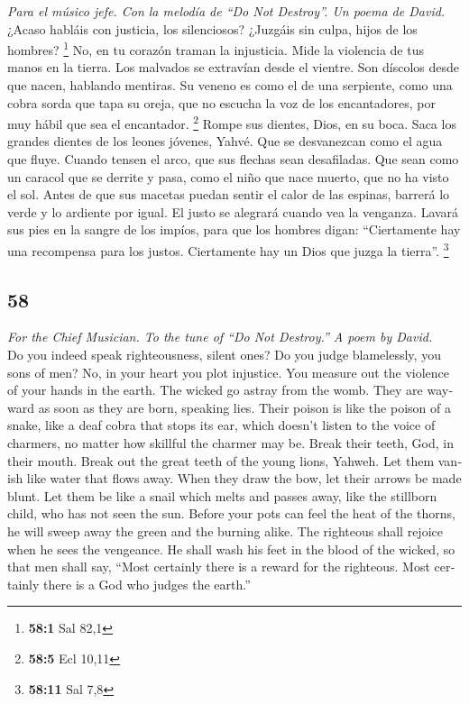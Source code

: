 \begin{paracol}{2}
\emph{Para el músico jefe. Con la melodía de ``Do Not Destroy''. Un
poema de David.}\\
 ¿Acaso habláis con justicia, los silenciosos? ¿Juzgáis
sin culpa, hijos de los hombres? \footnote{\textbf{58:1} Sal 82,1}
 No, en tu corazón traman la injusticia. Mide la violencia
de tus manos en la tierra.  Los malvados se extravían
desde el vientre. Son díscolos desde que nacen, hablando mentiras.
 Su veneno es como el de una serpiente, como una cobra
sorda que tapa su oreja,  que no escucha la voz de los
encantadores, por muy hábil que sea el encantador. \footnote{\textbf{58:5}
  Ecl 10,11}  Rompe sus dientes, Dios, en su boca. Saca
los grandes dientes de los leones jóvenes, Yahvé.  Que se
desvanezcan como el agua que fluye. Cuando tensen el arco, que sus
flechas sean desafiladas.  Que sean como un caracol que se
derrite y pasa, como el niño que nace muerto, que no ha visto el sol.
 Antes de que sus macetas puedan sentir el calor de las
espinas, barrerá lo verde y lo ardiente por igual.  El
justo se alegrará cuando vea la venganza. Lavará sus pies en la sangre
de los impíos,  para que los hombres digan: ``Ciertamente
hay una recompensa para los justos. Ciertamente hay un Dios que juzga la
tierra''. \footnote{\textbf{58:11} Sal 7,8}

\switchcolumn
\begin{otherlanguage}{english}

\hypertarget{section-115}{%
\section{58}\label{section-115}}

\emph{For the Chief Musician. To the tune of ``Do Not Destroy.'' A poem
by David.}\\
 Do you indeed speak righteousness, silent ones? Do you
judge blamelessly, you sons of men?  No, in your heart you
plot injustice. You measure out the violence of your hands in the earth.
 The wicked go astray from the womb. They are wayward as
soon as they are born, speaking lies.  Their poison is
like the poison of a snake, like a deaf cobra that stops its ear,
 which doesn't listen to the voice of charmers, no matter
how skillful the charmer may be.  Break their teeth, God,
in their mouth. Break out the great teeth of the young lions, Yahweh.
 Let them vanish like water that flows away. When they
draw the bow, let their arrows be made blunt.  Let them be
like a snail which melts and passes away, like the stillborn child, who
has not seen the sun.  Before your pots can feel the heat
of the thorns, he will sweep away the green and the burning alike.
 The righteous shall rejoice when he sees the vengeance.
He shall wash his feet in the blood of the wicked,  so
that men shall say, ``Most certainly there is a reward for the
righteous. Most certainly there is a God who judges the earth.''


\end{otherlanguage}
\end{paracol}
